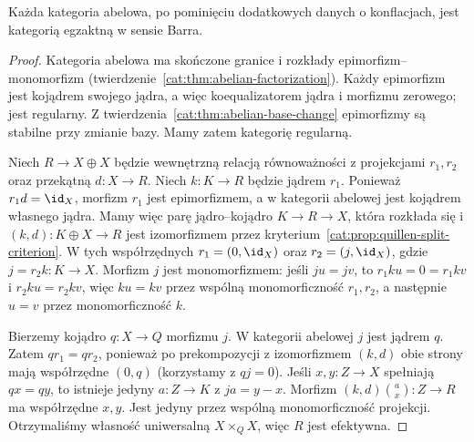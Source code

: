\begin{twierdzenie}\label{cat:thm:barr-abelian}
Każda kategoria abelowa, po pominięciu dodatkowych danych o konflacjach, jest kategorią egzaktną w sensie Barra.
\end{twierdzenie}
\begin{proof}
Kategoria abelowa ma skończone granice i rozkłady epimorfizm--monomorfizm (twierdzenie~\ref{cat:thm:abelian-factorization}). Każdy epimorfizm jest kojądrem swojego jądra, a więc koequalizatorem jądra i morfizmu zerowego; jest regularny. Z twierdzenia~\ref{cat:thm:abelian-base-change} epimorfizmy są stabilne przy zmianie bazy. Mamy zatem kategorię regularną.

Niech $R\to X\oplus X$ będzie wewnętrzną relacją równoważności z projekcjami $r_1,r_2$ oraz przekątną $d:X\to R$. Niech $k:K\to R$ będzie jądrem $r_1$. Ponieważ $r_1d=\id_X$, morfizm $r_1$ jest epimorfizmem, a w kategorii abelowej jest kojądrem własnego jądra. Mamy więc parę jądro--kojądro $K\to R\to X$, która rozkłada się i $(k,d):K\oplus X\to R$ jest izomorfizmem przez kryterium~\ref{cat:prop:quillen-split-criterion}. W tych współrzędnych $r_1=(0,\id_X)$ oraz $r_2=(j,\id_X)$, gdzie $j=r_2k:K\to X$. Morfizm $j$ jest monomorfizmem: jeśli $ju=jv$, to $r_1ku=0=r_1kv$ i $r_2ku=r_2kv$, więc $ku=kv$ przez wspólną monomorficzność $r_1,r_2$, a następnie $u=v$ przez monomorficzność $k$.

Bierzemy kojądro $q:X\to Q$ morfizmu $j$. W kategorii abelowej $j$ jest jądrem $q$. Zatem $qr_1=qr_2$, ponieważ po prekompozycji z izomorfizmem $(k,d)$ obie strony mają współrzędne $(0,q)$ (korzystamy z $qj=0$). Jeśli $x,y:Z\to X$ spełniają $qx=qy$, to istnieje jedyny $a:Z\to K$ z $ja=y-x$. Morfizm $(k,d)\binom{a}{x}:Z\to R$ ma współrzędne $x,y$. Jest jedyny przez wspólną monomorficzność projekcji. Otrzymaliśmy własność uniwersalną $X\times_Q X$, więc $R$ jest efektywna.
\end{proof}

